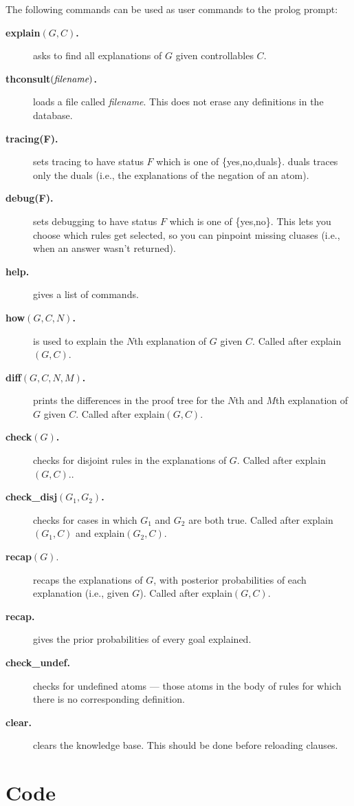 \documentclass[11pt,fleqn]{article}
\newcommand{\btt}{\ttfamily\bfseries}
\begin{document}
The following commands can be used as
user commands to the prolog prompt:
\begin{description}
\item[{\btt explain$(G,C)$.}] asks to find all explanations of $G$
given controllables $C$.
\item[{\btt thconsult$(\hbox{\em filename})$.}] loads a file called
{\em filename}. This does not erase any definitions in the database.
\item[{\btt tracing(F).}] sets tracing to have status $F$ which is
one of {\ttfamily \{yes,no,duals\}}. {\ttfamily duals} traces only the
duals (i.e., the explanations of the negation of an atom).
\item[{\btt debug(F).}] sets debugging to have status $F$ which is
one of {\ttfamily \{yes,no\}}. This lets you choose which rules get
selected, so you can pinpoint missing cluases (i.e., when an answer
wasn't returned).
\item[{\btt help.}] gives a list of commands.
\item[{\btt how$(G,C,N)$.}]
is used to explain the $N$th explanation of $G$ given $C$. Called
after {\ttfamily explain$(G,C)$.}
\item[{\btt diff$(G,C,N,M)$.}] 
prints the differences in the proof tree for the $N$th and $M$th
explanation of $G$ given $C$. Called after {\ttfamily explain$(G,C)$}.
\item[{\btt check$(G)$.}] 
checks for disjoint rules in the explanations of $G$.
 Called after {\ttfamily explain$(G,C)$.}.
\item[{\btt check\_disj$(G_1,G_2)$.}] 
checks for cases in which $G_1$ and $G_2$ are both true.
 Called after {\ttfamily explain$(G_1,C)$} and {\ttfamily explain$(G_2,C)$}.
\item[{\btt recap$(G).$}] 
recaps the explanations of $G$, with posterior probabilities of each
 explanation (i.e., given $G$). 
 Called after {\ttfamily explain$(G,C)$}.
\item[{\btt recap.}] 
gives the prior probabilities of every goal explained.
\item[{\btt check\_undef.}] checks for undefined atoms --- those atoms
in the body of rules for which there is no corresponding definition.
\item[{\btt clear.}] clears the knowledge base. This should be done before reloading clauses.
\end{description}

\section{Code}
\end{document}
